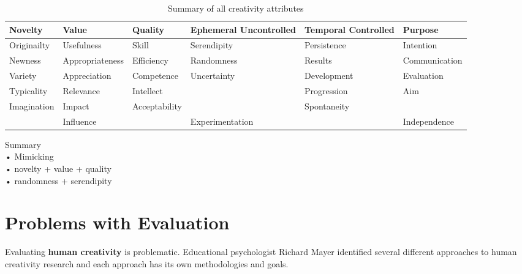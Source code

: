 \begin{table}[h]
\begin{tabular}{|l|p{2cm}|l|p{2.5cm}|p{2.5cm}|l|}
\hline
\textbf{Novelty} & \textbf{Value}  & \textbf{Quality} & \textbf{Ephemeral Uncontrolled} & \textbf{Temporal Controlled} & \textbf{Purpose} \\ \hline
Originailty      & Usefulness      & Skill            & Serendipity                     & Persistence                  & Intention        \\ \hline
Newness          & Appropriateness & Efficiency       & Randomness                      & Results                      & Communication    \\ \hline
Variety          & Appreciation    & Competence       & Uncertainty                     & Development                  & Evaluation       \\ \hline
Typicality       & Relevance       & Intellect        &                                 & Progression                  & Aim              \\ \hline
Imagination      & Impact          & Acceptability    &                                 & Spontaneity                  &                  \\ \hline
                 & Influence       &                  & Experimentation                 &                              & Independence     \\ \hline
\end{tabular}
\caption[Creativity attributes]{Summary of all creativity attributes}
\end{table}

\begin{shaded}
Summary\\
•	Mimicking\\
•	novelty + value + quality\\
•	randomness + serendipity
\end{shaded}

\section{Problems with Evaluation}

Evaluating \textbf{human creativity} is problematic. Educational psychologist Richard Mayer identified several different approaches to human creativity research and each approach has its own methodologies and goals. \citep[p.453]{Mayer1999}

